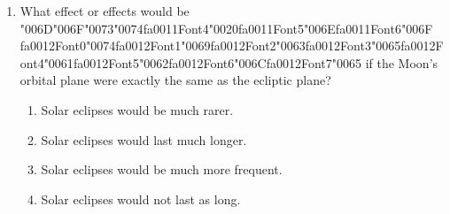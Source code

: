 \documentclass[12pt]{article}
\begin{document}
\begin{enumerate}[label=\arabic*.]
\begin{enumerate}[label=(\alph*)]
\end{enumerate}
\item What effect or effects would be {\char"006D}{\char"006F}{\char"0073}{\char"0074}{\csname fa0011Font4\endcsname\char"0020}{\csname fa0011Font5\endcsname\char"006E}{\csname fa0011Font6\endcsname\char"006F} {\csname fa0012Font0\endcsname\char"0074}{\csname fa0012Font1\endcsname\char"0069}{\csname fa0012Font2\endcsname\char"0063}{\csname fa0012Font3\endcsname\char"0065}{\csname fa0012Font4\endcsname\char"0061}{\csname fa0012Font5\endcsname\char"0062}{\csname fa0012Font6\endcsname\char"006C}{\csname fa0012Font7\endcsname\char"0065} if the Moon's orbital plane were exactly
the same as the ecliptic plane?
\begin{enumerate}[label=(\alph*)]
    \item Solar eclipses would be much rarer.
    \item Solar eclipses would last much longer.
    \item Solar eclipses would be much more frequent.
    \item Solar eclipses would not last as long.
\end{enumerate}
\end{enumerate}
\end{document}
